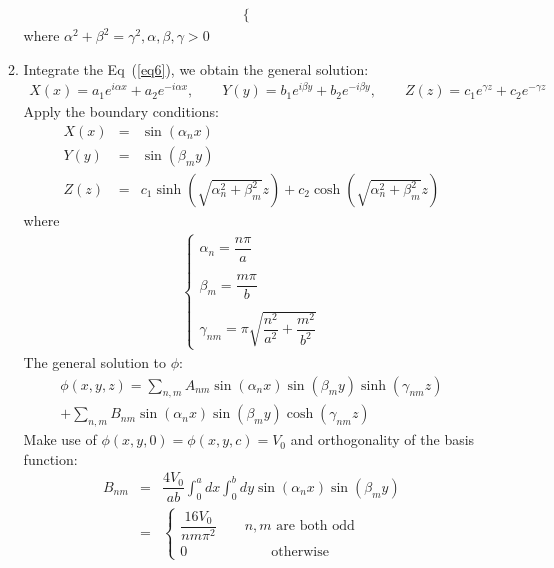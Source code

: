 \documentclass[a4paper,11pt]{article}
\begin{document}
\begin{enumerate}
\begin{enumerate}
\begin{eqnarray}
\begin{cases}
            \end{cases}
        \end{eqnarray}
        where $\alpha^2+\beta^2=\gamma^2,\alpha,\beta,\gamma>0$
        \item Integrate the Eq~(\ref{eq6}), we obtain the general solution:
        \begin{eqnarray}
            X(x)=a_1e^{i\alpha x}+a_2e^{-i\alpha x},\quad\quad Y(y)=b_1e^{i\beta y}+b_2e^{-i\beta y}, \quad\quad Z(z)=c_1e^{\gamma z}+c_2e^{-\gamma z}
        \end{eqnarray}
        Apply the boundary conditions:
        \begin{eqnarray}
            X(x)&=&\sin(\alpha_n x) \nonumber\\
            Y(y)&=&\sin(\beta_m y) \nonumber\\
            Z(z)&=&c_1\sinh(\sqrt{\alpha_n^2+\beta_m^2} z)+c_2\cosh(\sqrt{\alpha_n^2+\beta_m^2} z) 
        \end{eqnarray}
        where
        \begin{eqnarray}
            \begin{cases}
                \alpha_n=\dfrac{n\pi}{a} \\
                \quad \\
                \beta_m=\dfrac{m\pi}{b} \\
                \quad \\
                \gamma_{nm}=\pi\sqrt{\dfrac{n^2}{a^2}+\dfrac{m^2}{b^2}}
            \end{cases}
        \end{eqnarray}
        The general solution to $\phi$:
        \begin{eqnarray}
            \phi(x,y,z)=\sum\limits_{n,m}A_{nm}\sin(\alpha_n x)\sin(\beta_m y)\sinh(\gamma_{nm} z)\nonumber \\
            +\sum\limits_{n,m}B_{nm}\sin(\alpha_n x)\sin(\beta_m y)\cosh(\gamma_{nm} z)
        \end{eqnarray}
        Make use of $\phi(x,y,0)=\phi(x,y,c)=V_0$ and orthogonality of the basis function:
        \begin{eqnarray}
            B_{nm}&=&\dfrac{4V_0}{ab}\int_{0}^{a}dx\int_{0}^{b}dy\sin(\alpha_n x)\sin(\beta_m y)\nonumber\\
            &=&\begin{cases}
                \dfrac{16V_0}{nm\pi^2}\quad\quad \textrm{$n,m$ are both odd}\\
                0\quad\quad\quad\quad\quad\quad \textrm{otherwise}

\end{cases}
\end{eqnarray}
\end{enumerate}
\end{enumerate}
\end{document}
